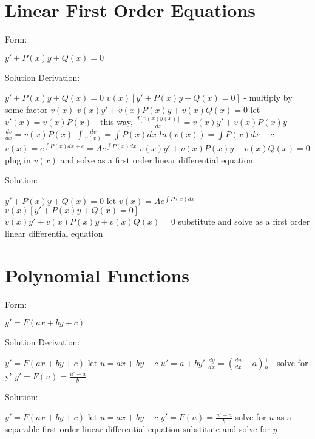 \documentclass[12 pt, oneside]{book}
\begin{document}
\section{Linear First Order Equations}
Form:
\begin{mathline}
$y'+P(x)y+Q(x)=0$
\end{mathline}
Solution Derivation:
\begin{mathline}
$y'+P(x)y+Q(x)=0$\newline{}
$v(x)[y'+P(x)y+Q(x)=0]$ - multiply by some factor $v(x)$\newline{}
$v(x)y'+v(x)P(x)y+v(x)Q(x)=0$\newline{}
  \indent let $v'(x)=v(x)P(x)$ - this way,  $\frac{d[v(x)y(x)]}{dx}=v(x)y'+v(x)P(x)y$\newline{}
  \indent $\frac{dv}{dx}=v(x)P(x)$\newline{}
  \indent $\int \frac{dv}{v(x)}=\int P(x)dx$\newline{} 
  \indent $ln(v(x))=\int P(x)dx + c$ \newline{}
  \indent $v(x)=e^{\int P(x)dx + c}=Ae^{\int P(x)dx}$\newline{}
$v(x)y'+v(x)P(x)y+v(x)Q(x)=0$\newline{}
plug in $v(x)$ and solve as a first order linear differential equation
\end{mathline}
Solution:
\begin{mathline}
$y'+P(x)y+Q(x)=0$\newline{}
let $v(x)=Ae^{\int P(x)dx}$\newline{}
$v(x)[y'+P(x)y+Q(x)=0]$\newline{}
$v(x)y'+v(x)P(x)y+v(x)Q(x)=0$\newline{}
substitute and solve as a first order linear differential equation
\end{mathline}

\section{Polynomial Functions}
Form:
\begin{mathline}
$y'=F(ax+by+c)$
\end{mathline}
Solution Derivation:
\begin{mathline}
$y'=F(ax+by+c)$\newline{}
\indent let $u=ax+by+c$\newline{}
\indent$u'=a+by'$\newline{}
\indent$\frac{dy}{dx}=(\frac{du}{dx}-a)\frac{1}{b}$ - solve for y'\newline{}
$y'=F(u)=\frac{u'-a}{b}$\newline{}
\end{mathline}
Solution:
\begin{mathline}
$y'=F(ax+by+c)$\newline{}
let $u=ax+by+c$\newline{}
$y'=F(u)=\frac{u'-a}{b}$\newline{}
solve for $u$ as a separable first order linear differential equation\newline{}
substitute and solve for $y$
\end{mathline}
\end{document}
